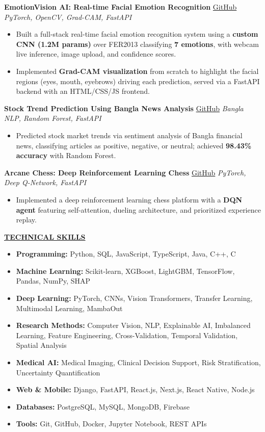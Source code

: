 \documentclass[10pt,letterpaper]{article}
\newcommand{\sectiontitle}[1]{\vspace{3pt}\noindent\underline{\textbf{#1}}\vspace{2pt}\par}
\begin{document}
\textbf{EmotionVision AI: Real-time Facial Emotion Recognition} \;\textbar\;\href{https://github.com/nakib33/EmotionVision-AI.git}{GitHub} \;\textbar\;\textit{PyTorch, OpenCV, Grad-CAM, FastAPI}
\begin{itemize}
  \item Built a full-stack real-time facial emotion recognition system using a \textbf{custom CNN (1.2M params)} over FER2013 classifying \textbf{7 emotions}, with webcam live inference, image upload, and confidence scores.
  \item Implemented \textbf{Grad-CAM visualization} from scratch to highlight the facial regions (eyes, mouth, eyebrows) driving each prediction, served via a FastAPI backend with an HTML/CSS/JS frontend.
\end{itemize}

\textbf{Stock Trend Prediction Using Bangla News Analysis} \;\textbar\;\href{https://github.com/nakib33/Stock-trend-prediction-using-news-analysis}{GitHub} \;\textbar\;\textit{Bangla NLP, Random Forest, FastAPI}
\begin{itemize}
  \item Predicted stock market trends via sentiment analysis of Bangla financial news, classifying articles as positive, negative, or neutral; achieved \textbf{98.43\% accuracy} with Random Forest.
\end{itemize}

\textbf{Arcane Chess: Deep Reinforcement Learning Chess} \;\textbar\;\href{https://github.com/nakib33/Deep-Reinforcement-Learning-Chess/}{GitHub} \;\textbar\;\textit{PyTorch, Deep Q-Network, FastAPI}
\begin{itemize}
  \item Implemented a deep reinforcement learning chess platform with a \textbf{DQN agent} featuring self-attention, dueling architecture, and prioritized experience replay.
\end{itemize}

\sectiontitle{TECHNICAL SKILLS}
\begin{itemize}
  \item \textbf{Programming:} Python, SQL, JavaScript, TypeScript, Java, C++, C
  \item \textbf{Machine Learning:} Scikit-learn, XGBoost, LightGBM, TensorFlow, Pandas, NumPy, SHAP
  \item \textbf{Deep Learning:} PyTorch, CNNs, Vision Transformers, Transfer Learning, Multimodal Learning, MambaOut
  \item \textbf{Research Methods:} Computer Vision, NLP, Explainable AI, Imbalanced Learning, Feature Engineering, Cross-Validation, Temporal Validation, Spatial Analysis
  \item \textbf{Medical AI:} Medical Imaging, Clinical Decision Support, Risk Stratification, Uncertainty Quantification
  \item \textbf{Web \& Mobile:} Django, FastAPI, React.js, Next.js, React Native, Node.js
  \item \textbf{Databases:} PostgreSQL, MySQL, MongoDB, Firebase
  \item \textbf{Tools:} Git, GitHub, Docker, Jupyter Notebook, REST APIs
\end{itemize}
\end{document}
